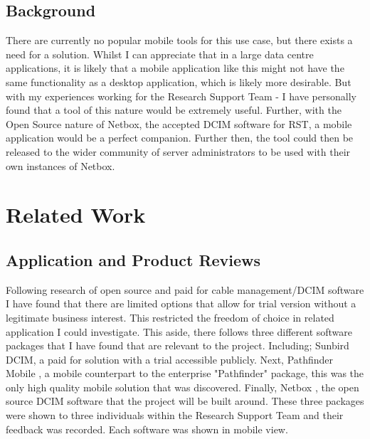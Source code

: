 \documentclass [11pt,a4paper]{article}
\begin{document}
\subsection{Background}
\label{sec:background}

There are currently no popular mobile tools for this use case, but there exists a need for a solution. Whilst I can appreciate that in a large data centre applications, it is likely that a mobile application like this might not have the same functionality as a desktop application, which is likely more desirable. But with my experiences working for the Research Support Team - I have personally found that a tool of this nature would be extremely useful. Further, with the Open Source nature of Netbox, the accepted DCIM software for RST, a mobile application would be a perfect companion. Further then, the tool could then be released to the wider community of server administrators to be used with their own instances of Netbox.

\section{Related Work}
\subsection{Application and Product Reviews}
\label{sec:app_reviews}

Following research of open source and paid for cable management/DCIM software I have found that there are limited options that allow for trial version without a legitimate business interest. This restricted the freedom of choice in related application I could investigate. This aside, there follows three different software packages that I have found that are relevant to the project. Including; Sunbird DCIM\cite{Sunbird}, a paid for solution with a trial accessible publicly. Next, Pathfinder Mobile \cite{Pathfinder}, a mobile counterpart to the enterprise "Pathfinder" package, this was the only high quality mobile solution that was discovered. Finally, Netbox \cite{Netbox}, the open source DCIM software that the project will be built around. These three packages were shown to three individuals within the Research Support Team and their feedback was recorded. Each software was shown in mobile view. 
\end{document}
